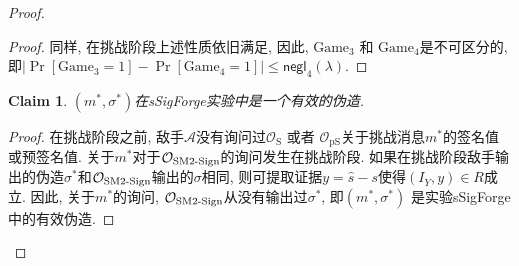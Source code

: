 \documentclass[review]{jcr}
\newtheorem{claim}{Claim}
\begin{document}
\begin{proof}
\begin{proof}
同样, 在挑战阶段上述性质依旧满足, 因此, $\text{Game}_3$ 和 $\text{Game}_4$是不可区分的, 即$|\Pr[\text{Game}_3 = 1] - \Pr[\text{Game}_4 = 1]|\leq\mathsf{negl}_4(\lambda).$
\end{proof}

\begin{claim}
$(m^*,\sigma^*)$在sSigForge实验中是一个有效的伪造. 
\end{claim}

\begin{proof}
在挑战阶段之前, 敌手$\mathcal{A}$没有询问过$\mathcal{O}_{\text{S}}$ 或者 $\mathcal{O}_{\text{pS}}$关于挑战消息$m^*$的签名值或预签名值. 关于$m^*$对于$\mathcal{O}_{\text{SM2\text{-}Sign}}$的询问发生在挑战阶段. 如果在挑战阶段敌手输出的伪造$\sigma^*$和$\mathcal{O}_{\text{SM2\text{-}Sign}}$输出的$\sigma$相同, 则可提取证据$y=\hat{s}-s$使得$(I_Y, y) \in R$成立. 因此, 关于$m^*$的询问, $\mathcal{O}_{\text{SM2\text{-}Sign}}$从没有输出过$\sigma^*$, 即$(m^*,\sigma^*)$ 是实验sSigForge中的有效伪造. 
\end{proof}

\begin{center}
\end{center}
\end{proof}
\end{document}

